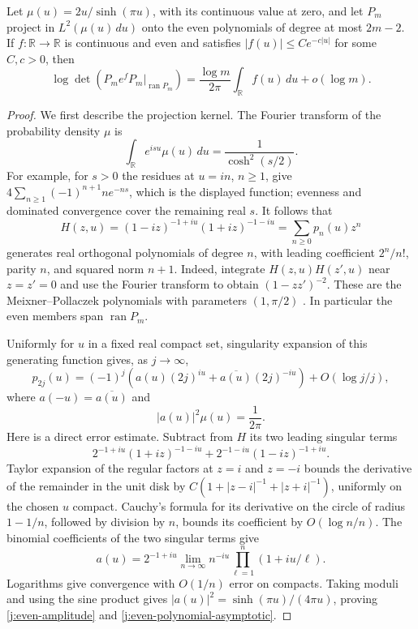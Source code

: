 \begin{lemma}\label{j:even-log-statistic}
Let $\mu(u)=2u/\sinh(\pi u)$, with its continuous value at zero, and let
$P_m$ project in $L^2(\mu(u)\,du)$ onto the even polynomials of degree at
most $2m-2$. If $f:\mathbb R\to\mathbb R$ is continuous and even and
satisfies $|f(u)|\le C e^{-c|u|}$ for some $C,c>0$, then
\[
 \log\det(P_m e^fP_m|_{\operatorname{ran}P_m})
 =\frac{\log m}{2\pi}\int_{\mathbb R}f(u)\,du+o(\log m).
\]
\end{lemma}

\begin{proof}
We first describe the projection kernel. The Fourier transform of the
probability density $\mu$ is
\[
 \int_{\mathbb R}e^{isu}\mu(u)\,du=\frac1{\cosh^2(s/2)}.
\]
For example, for $s>0$ the residues at $u=in$, $n\ge1$, give
$4\sum_{n\ge1}(-1)^{n+1}ne^{-ns}$, which is the displayed function;
evenness and dominated convergence cover the remaining real $s$.
It follows that
\[
 H(z,u)=(1-iz)^{-1+iu}(1+iz)^{-1-iu}
       =\sum_{n\ge0}p_n(u)z^n
\]
generates real orthogonal polynomials of degree $n$, with leading
coefficient $2^n/n!$, parity $n$, and squared norm $n+1$. Indeed,
integrate $H(z,u)H(z',u)$ near $z=z'=0$ and use the
Fourier transform to obtain $(1-zz')^{-2}$. These are the
Meixner--Pollaczek polynomials with parameters $(1,\pi/2)$
\cite[Equation~18.23.7]{DLMF}. In particular the even members span
$\operatorname{ran}P_m$.

Uniformly for $u$ in a fixed real compact set, singularity expansion of
this generating function gives, as $j\to\infty$,
\begin{equation}\label{j:even-polynomial-asymptotic}
 p_{2j}(u)=(-1)^j\left(
 a(u)(2j)^{iu}+\overline{a(u)}(2j)^{-iu}\right)
 +O(\log j/j),
\end{equation}
where $a(-u)=\overline{a(u)}$ and
\begin{equation}\label{j:even-amplitude}
 |a(u)|^2\mu(u)=\frac1{2\pi}.
\end{equation}
Here is a direct error estimate. Subtract from $H$ its two leading
singular terms
\[
 2^{-1+iu}(1+iz)^{-1-iu}
 +2^{-1-iu}(1-iz)^{-1+iu}.
\]
Taylor expansion of the regular factors at $z=i$ and $z=-i$ bounds the
derivative of the remainder in the unit disk by
$C(1+|z-i|^{-1}+|z+i|^{-1})$, uniformly on the chosen $u$ compact.
Cauchy's formula for its derivative on the circle of radius $1-1/n$,
followed by division by $n$, bounds its coefficient by $O(\log n/n)$.
The binomial coefficients of the two
singular terms give
\[
 a(u)=2^{-1+iu}\lim_{n\to\infty}
       n^{-iu}\prod_{\ell=1}^n(1+iu/\ell).
\]
Logarithms give convergence with $O(1/n)$ error on compacts. Taking
moduli and using the sine product gives
$|a(u)|^2=\sinh(\pi u)/(4\pi u)$, proving
\eqref{j:even-amplitude} and \eqref{j:even-polynomial-asymptotic}.


\end{proof}
